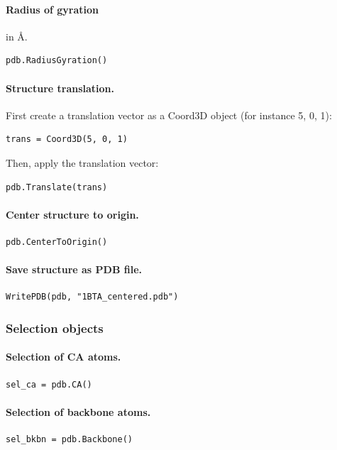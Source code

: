 \documentclass[12pt,a4paper]{article}
\begin{document}
\paragraph{Radius of gyration} in \AA.
\begin{verbatim}
pdb.RadiusGyration()
\end{verbatim}


\paragraph{Structure translation.}
First create a translation vector as a Coord3D object (for instance 5, 0, 1):
\begin{verbatim}
trans = Coord3D(5, 0, 1)
\end{verbatim}
Then, apply the translation vector:
\begin{verbatim}
pdb.Translate(trans)
\end{verbatim}


\paragraph{Center structure to origin.}
\begin{verbatim}
pdb.CenterToOrigin()
\end{verbatim}


\paragraph{Save structure as PDB file.}
\begin{verbatim}
WritePDB(pdb, "1BTA_centered.pdb")
\end{verbatim}


\subsubsection{Selection objects}

\paragraph{Selection of CA atoms.}
\begin{verbatim}
sel_ca = pdb.CA()
\end{verbatim}


\paragraph{Selection of backbone atoms.}
\begin{verbatim}
sel_bkbn = pdb.Backbone()
\end{verbatim}
\end{document}

